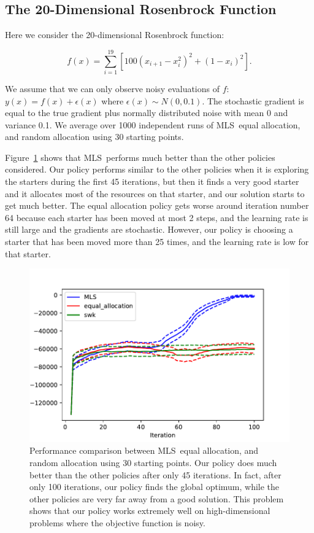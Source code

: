 \documentclass[12pt,english]{article}
\newcommand{\stedit}[1]{{\color{blue} #1}}
\newcommand{\abbrv}{MLS}
\begin{document}
\subsection{The 20-Dimensional Rosenbrock Function}
\label{rosenbrock}

Here we consider the 20-dimensional Rosenbrock function:

\[
f(x)=\sum_{i=1}^{19}\left[100\left(x_{i+1}-x_{i}^{2}\right)^{2}+\left(1-x_{i}\right)^{2}\right].
\]

We assume that we can only observe noisy evaluations of $f$: $y(x)=f(x)+\epsilon(x)$ where $\epsilon(x)\sim N(0, 0.1)$. The stochastic gradient is equal to the true gradient plus normally distributed noise with mean 0 and variance 0.1. We average over 1000 independent runs of \abbrv\, equal allocation, and random allocation using 30 starting points. 

\stedit{Figure~\ref{fig:rosenbrock} shows that \abbrv\ performs much better than the other policies considered. Our policy performs similar to the other policies when it is exploring the starters during the first 45 iterations, but then it finds a very good starter and it allocates most of the resources on that starter, and our solution starts to get much better. The equal allocation policy gets worse around iteration number 64 because each starter has been moved at most 2 steps, and the learning rate is still large and the gradients are stochastic. However, our policy is choosing a starter that has been moved more than 25 times, and the learning rate is low for that starter.}



\begin{figure}[!htbp]
\begin{center}
\includegraphics[width=0.50\linewidth]{new_plot.pdf}
\caption{
Performance comparison between \abbrv\, equal allocation, and random allocation using $30$ starting points. Our policy does much better than the other policies after only 45 iterations. In fact, after only 100 iterations, our policy finds the global optimum, while the other policies are very far away from a good solution. This problem shows that our policy works extremely well on high-dimensional problems where the objective function is noisy.
\label{fig:rosenbrock}}
\end{center}
\end{figure}
\end{document}
